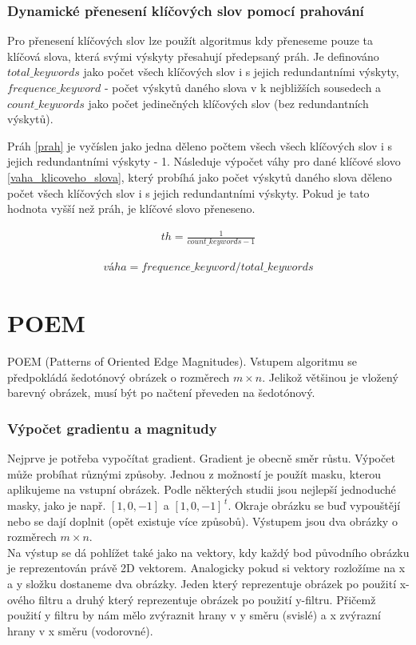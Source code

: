 \documentclass[czech,BP]{thesiskiv}
\begin{document}
\subsection{Dynamické přenesení klíčových slov pomocí prahování}
\par Pro přenesení klíčových slov lze použít algoritmus kdy přeneseme pouze ta klíčová slova, která svými výskyty přesahují předepsaný práh. Je definováno $total\_keywords$ jako počet všech klíčových slov i s jejich redundantními výskyty, $frequence\_keyword$ - počet výskytů daného slova v k nejbližších sousedech a $count\_keywords$ jako počet jedinečných klíčových slov (bez redundantních výskytů).  

\par Práh \eqref{prah} je vyčíslen jako jedna děleno počtem všech všech klíčových slov i s jejich redundantními výskyty - 1. Následuje výpočet váhy pro dané klíčové slovo \eqref{vaha_klicoveho_slova}, který probíhá jako počet výskytů daného slova děleno počet všech klíčových slov i s jejich redundantními výskyty. Pokud je tato hodnota vyšší než práh, je klíčové slovo přeneseno.

\begin{align}
   \label{prah} th = \frac{1}{count\_keywords-1}
\end{align}

\begin{align}
   \label{vaha_klicoveho_slova} váha = frequence\_keyword / total\_keywords
\end{align} 
 
\chapter{POEM}
POEM (Patterns of Oriented Edge Magnitudes). Vstupem algoritmu se předpokládá šedotónový obrázek o rozměrech  $m \times n$. Jelikož většinou je vložený barevný obrázek, musí být po načtení převeden na šedotónový. \cite{SrovnaniDeskriptoru}

\subsection{Výpočet gradientu a magnitudy}
Nejprve je potřeba vypočítat gradient. Gradient je obecně směr růstu. Výpočet může probíhat různými způsoby. Jednou z možností je použít masku, kterou aplikujeme na vstupní obrázek. Podle některých studii jsou nejlepší jednoduché masky, jako je např. $[1, 0, -1]$ a $[1, 0, -1]^{\,t}$. Okraje obrázku se buď vypouštějí nebo se dají doplnit (opět existuje více způsobů). Výstupem jsou dva obrázky o rozměrech $m \times n$. \\
Na výstup se dá pohlížet také jako na vektory, kdy každý bod původního obrázku je reprezentován právě 2D vektorem. Analogicky pokud si vektory rozložíme na x a y složku dostaneme dva obrázky. Jeden který reprezentuje obrázek po použití x-ového filtru a druhý který reprezentuje obrázek po použití y-filtru. Přičemž použití y filtru by nám mělo zvýraznit hrany v y směru (svislé) a x zvýrazní hrany v x směru (vodorovné). \\
\end{document}
